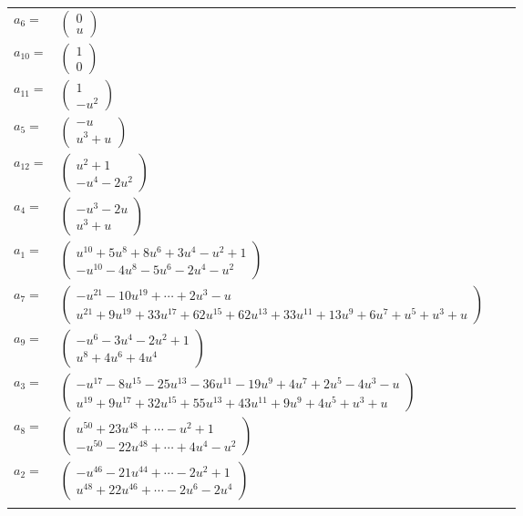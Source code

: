 \documentclass[1p]{elsarticle_modified}
\theoremstyle{definition}
\begin{document}
\begin{tabular}{m{7pt} m{180pt} m{7pt} m{180pt} }
\flushright $a_{6}=$&$\begin{pmatrix}0\\u\end{pmatrix}$ \\
\flushright $a_{10}=$&$\begin{pmatrix}1\\0\end{pmatrix}$ \\
\flushright $a_{11}=$&$\begin{pmatrix}1\\- u^2\end{pmatrix}$ \\
\flushright $a_{5}=$&$\begin{pmatrix}- u\\u^3+u\end{pmatrix}$ \\
\flushright $a_{12}=$&$\begin{pmatrix}u^2+1\\- u^4-2 u^2\end{pmatrix}$ \\
\flushright $a_{4}=$&$\begin{pmatrix}- u^3-2 u\\u^3+u\end{pmatrix}$ \\
\flushright $a_{1}=$&$\begin{pmatrix}u^{10}+5 u^8+8 u^6+3 u^4- u^2+1\\- u^{10}-4 u^8-5 u^6-2 u^4- u^2\end{pmatrix}$ \\
\flushright $a_{7}=$&$\begin{pmatrix}- u^{21}-10 u^{19}+\cdots+2 u^3- u\\u^{21}+9 u^{19}+33 u^{17}+62 u^{15}+62 u^{13}+33 u^{11}+13 u^9+6 u^7+u^5+u^3+u\end{pmatrix}$ \\
\flushright $a_{9}=$&$\begin{pmatrix}- u^6-3 u^4-2 u^2+1\\u^8+4 u^6+4 u^4\end{pmatrix}$ \\
\flushright $a_{3}=$&$\begin{pmatrix}- u^{17}-8 u^{15}-25 u^{13}-36 u^{11}-19 u^9+4 u^7+2 u^5-4 u^3- u\\u^{19}+9 u^{17}+32 u^{15}+55 u^{13}+43 u^{11}+9 u^9+4 u^5+u^3+u\end{pmatrix}$ \\
\flushright $a_{8}=$&$\begin{pmatrix}u^{50}+23 u^{48}+\cdots- u^2+1\\- u^{50}-22 u^{48}+\cdots+4 u^4- u^2\end{pmatrix}$ \\
\flushright $a_{2}=$&$\begin{pmatrix}- u^{46}-21 u^{44}+\cdots-2 u^2+1\\u^{48}+22 u^{46}+\cdots-2 u^6-2 u^4\end{pmatrix}$\\&\end{tabular}
\end{document}

